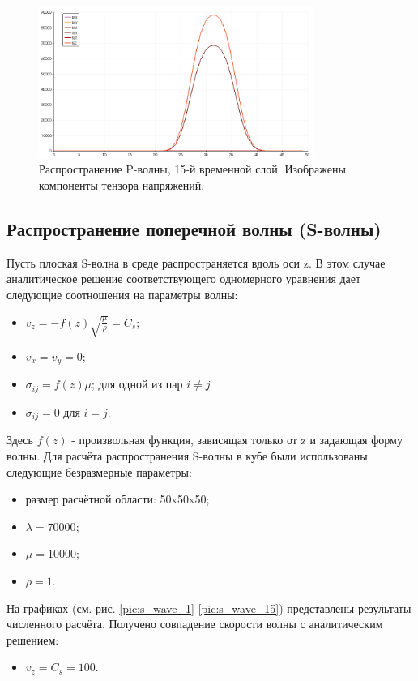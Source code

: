 \begin{figure}[htp]
\centering
\includegraphics[width=0.8\textwidth]{png/p-wave-test/s/0015.png}
\caption{Распространение P-волны, 15-й временной слой. Изображены компоненты тензора напряжений.}
\label{pic:p_wave_15}
\end{figure}

\clearpage
\newpage

\subsection{Распространение поперечной волны (S-волны)}
Пусть плоская S-волна в среде распространяется вдоль оси z. В этом случае аналитическое решение соответствующего одномерного уравнения дает следующие соотношения на параметры волны:
\begin{itemize}
\item $v_z=-f(z)\sqrt{\frac{\mu}{\rho}}=C_s$;
\item $v_x=v_y=0$;
\item $\sigma_{ij}=f(z)\mu$; для одной из пар $i \neq j$
\item $\sigma_{ij}=0$ для $i = j$.
\end{itemize}
Здесь $f(z)$ - произвольная функция, зависящая только от z и задающая форму волны.
Для расчёта распространения S-волны в кубе были использованы следующие безразмерные параметры: 
\begin{itemize}
\item размер расчётной области: 50x50x50;
\item $\lambda=70000$;
\item $\mu=10000$;
\item $\rho=1$.
\end{itemize}
На графиках (см. рис.
\ref{pic:s_wave_1}-\ref{pic:s_wave_15}) представлены результаты численного расчёта. Получено совпадение скорости волны с аналитическим решением:
\begin{itemize}
\item $v_z=C_s=100$.
\end{itemize}

